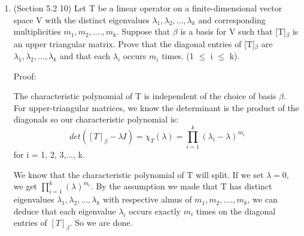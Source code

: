 \documentclass[12pt]{article}
\begin{document}
\begin{enumerate}
   
    \qedsymbol
    
    \item (Section 5.2 10)
    Let T be a linear operator on a finite-dimensional vector space V with the distinct eigenvalues $\lambda_1, \lambda_2, ..., \lambda_k$ and corresponding multiplicities $m_1, m_2, ...., m_k$. Suppose that $\beta$ is a basis for V such that [T]$_\beta$ is an upper triangular matrix. Prove that the diagonal entries of [T]$_\beta$ are $\lambda_1, \lambda_2, ..., \lambda_k$ and that each $\lambda_i$ occurs $m_i$ times. (1 $\leq$ i $\leq$ k).

    Proof:

    The characteristic polynomial of T is independent of the choice of basis $\beta$. For upper-triangular matrices, we know the determinant is the product of the diagonals so our characteristic polynomial is:
    \begin{equation}
        det([T]_\beta - \lambda I) = \chi_T (\lambda) = \prod_{i=1}^{k}(\lambda_i - \lambda)^{m_{i}}
    \end{equation}
    for i = 1, 2, 3,..., k.

    We know that the characteristic polynomial of T will split.
    If we set $\lambda = 0$, we get $\prod_{i=1}^{k}(\lambda)^{m_{i}}$. By the assumption we made that T has distinct eigenvalues $\lambda_1, \lambda_2, ..., \lambda_k$ with respective almus of $m_1, m_2, ...., m_k$, we can deduce that each eigenvalue $\lambda_i$ occurs exactly $m_i$ times on the diagonal entries of $[T]_\beta$. So we are done.
    \qedsymbol
    
    
\end{enumerate}
\end{document}
